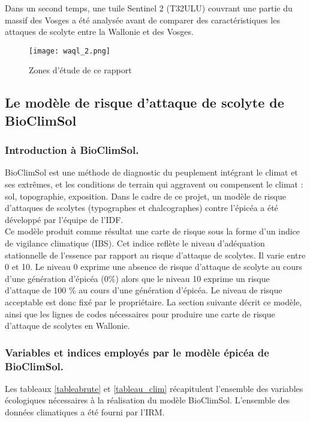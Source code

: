 Dans un second temps, une tuile Sentinel 2 (T32ULU) couvrant une partie du massif des Vosges a été analysée avant de comparer des caractéristiques les attaques de scolyte entre la Wallonie et des Vosges.

\begin{figure} [htbp] 
    \centering
    \texttt{[image: waql\_2.png]}
    \caption{Zones d'étude de ce rapport}
    \label{tuiles}
\end{figure}
 

 \newpage
\subsection{Le modèle de risque d'attaque de scolyte de BioClimSol}
 
 \subsubsection{Introduction à BioClimSol.}
 BioClimSol est une méthode de diagnostic du peuplement
 intégrant le climat et ses extrêmes, et les conditions de terrain qui aggravent ou compensent le climat : sol, topographie, exposition.
Dans le cadre de ce projet, un modèle de risque d’attaques de scolytes (typographes et chalcographes) contre l’épicéa a été développé par l'équipe de l'IDF. \\


Ce modèle produit comme résultat une carte de risque sous la forme d'un indice de vigilance climatique (IBS). Cet indice reflète le niveau d'adéquation stationnelle de l'essence par rapport au risque d'attaque de scolytes. Il varie entre 0 et 10. Le niveau 0 exprime une absence de risque d'attaque de scolyte au cours d'une génération d'épicéa (0\%) alors que le niveau 10 exprime un risque d'attaque de 100 \% au cours d'une génération d'épicéa. Le niveau de risque acceptable est donc fixé par le propriétaire.
La section suivante décrit ce modèle, ainsi que les lignes de codes nécessaires pour produire une carte de risque d'attaque de scolytes en Wallonie.

\subsubsection{Variables et indices employés par le modèle épicéa de BioClimSol.}


Les tableaux \ref{tableabrute} et \ref{tableau_clim} récapitulent l'ensemble des variables écologiques nécessaires à la réalisation du modèle BioClimSol. L'ensemble des données climatiques a été fourni par l'IRM.



